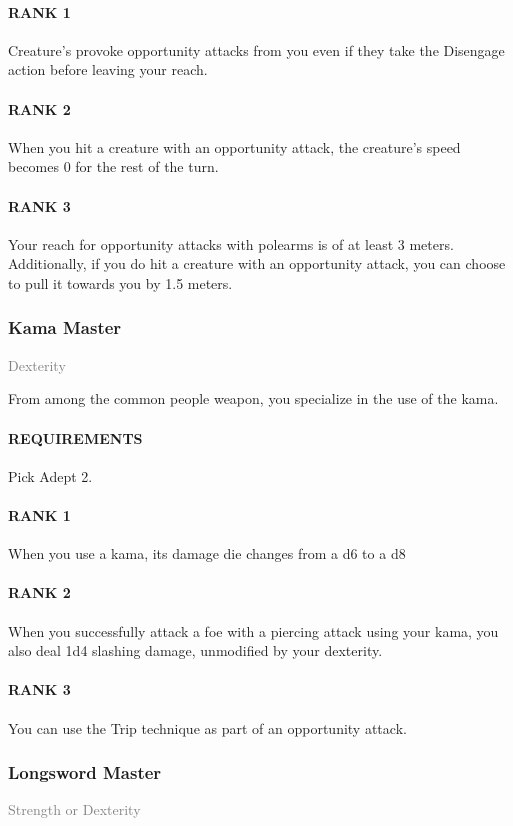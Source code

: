 \paragraph{RANK 1} Creature's provoke opportunity attacks from you even if they take the Disengage action before leaving your reach.
\paragraph{RANK 2} When you hit a creature with an opportunity attack, the creature's speed becomes 0 for the rest of the turn.
\paragraph{RANK 3} Your reach for opportunity attacks with polearms is of at least 3 meters.
Additionally, if you do hit a creature with an opportunity attack, you can choose to pull it towards you by 1.5 meters.

\subsubsection{Kama Master} \label{feat::kamamaster}
\small{\textcolor{gray}{Dexterity}}

\normalsize
From among the common people weapon, you specialize in the use of the kama.
\paragraph{REQUIREMENTS} Pick Adept 2.
\paragraph{RANK 1} When you use a kama, its damage die changes from a d6 to a d8
\paragraph{RANK 2} When you successfully attack a foe with a piercing attack using your kama, you also deal 1d4 slashing damage, unmodified by your dexterity.
\paragraph{RANK 3} You can use the Trip technique as part of an opportunity attack.

\subsubsection{Longsword Master} \label{feat::longswordmaster}
\small{\textcolor{gray}{Strength or Dexterity}}

